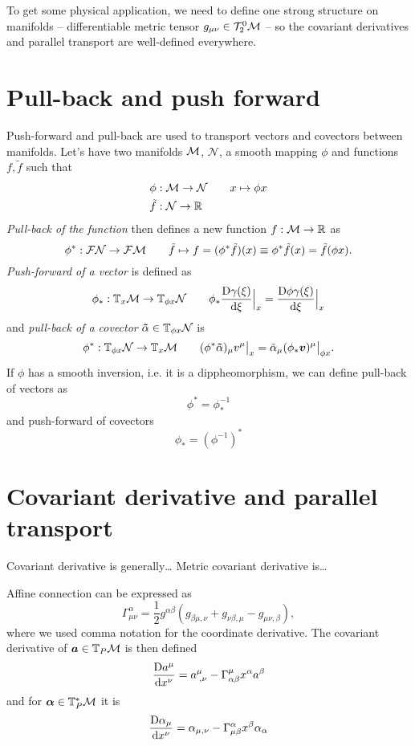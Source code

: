 To get some physical application, we need to define one strong structure on manifolds -- differentiable metric tensor $g_{\mu\nu}\in\mathcal{T}^0_2\mathcal{M}$ -- so the covariant derivatives and parallel transport are well-defined everywhere. 


\section{Pull-back and push forward}
Push-forward and pull-back are used to transport vectors and covectors between manifolds. Let's have two manifolds $\mathcal{M}$, $\mathcal{N}$, a smooth mapping $\phi$ and functions $f,\tilde f$ such that
\begin{align*}
    \phi&:\mathcal{M}\rightarrow \mathcal{N}\qquad x\mapsto \phi x\\
    \tilde f&:\mathcal{N}\rightarrow \mathbb{R} 
\end{align*}
\emph{Pull-back of the function} then defines a new function $
f:\mathcal{M}\rightarrow \mathbb{R} $ as
$$\phi^*:\mathcal{F} \mathcal{N}\rightarrow \mathcal{F}\mathcal{M} \qquad  \tilde f\mapsto f=(\phi^*\tilde f)(x)\equiv \phi^*\tilde f(x) =\tilde f(\phi x).$$
\emph{Push-forward of a vector} is defined as
$$\phi_*: \mathbb{T}_x\mathcal{M} \rightarrow \mathbb{T}_{\phi x}\mathcal N\qquad \phi_* 
\frac{\mathrm{D} \gamma(\xi)}{\mathrm{d} \xi}\Big|_x=\frac{\mathrm{D} \phi \gamma(\xi)}{\mathrm{d} \xi}\Big|_x$$
and \emph{pull-back of a covector} $\bm\tilde\alpha\in \mathbb{T}_{\phi x}\mathcal N$ is
$$\phi^*: \mathbb{T}_{\phi x}\mathcal N\rightarrow \mathbb{T}_x\mathcal{M}  \qquad (\phi^*\bm \tilde\alpha)_\mu v^\mu\big|_x= \tilde\alpha_\mu (\phi_* \bm v)^\mu\big|_{\phi x}.$$
If $\phi$ has a smooth inversion, i.e. it is a dippheomorphism, we can define pull-back of vectors as
\begin{equation}
    \phi^*=\phi_*^{-1}
\end{equation}
and push-forward of covectors
\begin{equation}
    \phi_*=(\phi^{-1})^*
\end{equation}

\section{Covariant derivative and parallel transport}
Covariant derivative is generally\dots
Metric covariant derivative is\dots


Affine connection can be expressed as
\begin{equation}
    \Gamma^{\alpha}_{\mu\nu} = \frac{1}{2}g^{\alpha \beta}\left(g_{\beta\mu,\nu}+g_{\nu\beta,\mu}-g_{\mu\nu,\beta}\right),
\end{equation}
where we used comma notation for the coordinate derivative.
The covariant derivative of $\bm a\in \mathbb{T}_P\mathcal{M}$ is then defined
\begin{equation}
    \frac{\mathrm{D} a^\mu}{\mathrm{d} x^\nu}=a_{\;,\nu}^\mu-\Gamma^\mu_{\alpha\beta} x^\alpha a^\beta 
\end{equation}
and for $\bm\alpha\in \mathbb{T}_P^*\mathcal{M}$ it is
\begin{equation}
    \frac{\mathrm{D} \alpha_\mu}{\mathrm{d} x^\nu}=\alpha_{\mu,\nu}-\Gamma^\alpha_{\mu\beta}x^\beta \alpha_\alpha 
\end{equation}

